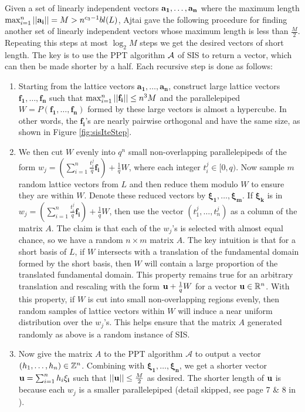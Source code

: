 \documentclass[../main.tex]{subfiles}
\begin{document}
Given a set of linearly independent vectors $\mathbf{a_1},\dots,\mathbf{a_n}$ where the maximum length $\max_{i=1}^n ||\mathbf{a_i}||=M > n^{c_3-1}bl(L)$, Ajtai gave the following procedure for finding another set of linearly independent vectors whose maximum length is less than $\frac{M}{2}$. Repeating this steps at most $\log_2 M$ steps we get the desired vectors of short length. The key is to use the PPT algorithm $\mathcal{A}$ of SIS to return a vector, which can then be made shorter by a half. Each recursive step is done as follows:
    \begin{enumerate}
        \item Starting from the lattice vectors $\mathbf{a_1}, \dots, \mathbf{a_n}$, construct large lattice vectors $\mathbf{f_1}, \dots, \mathbf{f_n}$ such that $\max_{i=1}^n ||\mathbf{f_i}|| \le n^3 M$ and the parallelepiped $W=P(\mathbf{f_1}, \dots, \mathbf{f_n})$ formed by these large vectors is almost a hypercube. In other words, the $\mathbf{f_i}$'s are nearly pairwise orthogonal and have the same size, as shown in Figure \ref{fig:sisIteStep}.
                
        \item We then cut $W$ evenly into $q^n$ small non-overlapping parallelepipeds of the form $w_j=(\sum_{i=1}^n \frac{t_i^j}{q}\mathbf{f_i}) +\frac{1}{q}W$, where each integer $t_i^j \in [0,q)$.  
        Now sample $m$ random lattice vectors from $L$ and then reduce them modulo $W$ to ensure they are within $W$. Denote these reduced vectors by $\mathbf{\xi_1}, \dots, \mathbf{\xi_m}$.         If $\mathbf{\xi_k}$ is in $w_j=(\sum_{i=1}^n \frac{t_i^j}{q}\mathbf{f_i})+\frac{1}{q}W$, then use the vector $(t_1^j, \dots, t_n^j)$ as a column of the matrix $A$. The claim is that each of the $w_j$'s is selected with almost equal chance, so we have a random $n \times m$ matrix $A$.
        The key intuition is that for a short basis of $L$, if $W$ intersects with a translation of the fundamental domain formed by the short basis, then $W$ will contain a large proportion of the translated fundamental domain. This property remains true for an arbitrary translation and rescaling with the form $\mathbf{u} + \frac{1}{q}W$ for a vector $\mathbf{u} \in \mathbb{R}^n$. With this property, if $W$ is cut into small non-overlapping regions evenly, then random samples of lattice vectors within $W$ will induce a near uniform distribution over the $w_j$'s. This helps ensure that the matrix $A$ generated randomly as above is a random instance of SIS. %

        \item Now give the matrix $A$ to the PPT algorithm $\mathcal{A}$ to output a vector $(h_1, \dots, h_n) \in \mathbb{Z}^n$. Combining with $\mathbf{\xi_1}, \dots, \mathbf{\xi_n}$, we get a shorter vector $\mathbf{u}=\sum_{i=1}^n h_i \mathbf{\xi_i}$ such that $||\mathbf{u}|| \le \frac{M}{2}$ as desired. The shorter length of $\mathbf{u}$ is because each $w_j$ is a smaller parallelepiped (detail skipped, see page 7 \& 8 in \cite{ajtai1996generating}). 
    \end{enumerate}
\end{document}
